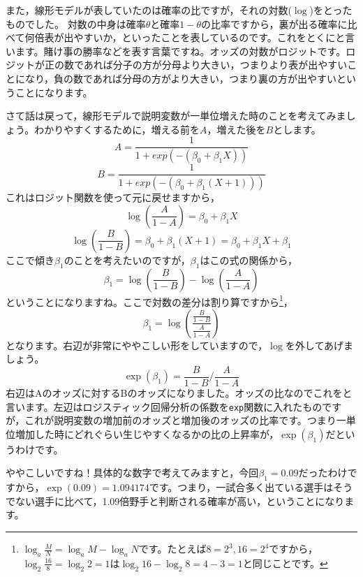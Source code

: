 \documentclass{ltjsbook}
\begin{document}
また，線形モデルが表していたのは確率の比ですが，それの対数($\log$)をとったものでした。
対数の中身は確率$\theta$と確率$1-\theta$の比率ですから，裏が出る確率に比べて何倍表が出やすいか，といったことを表しているのです。これをとくにと言います。賭け事の勝率などを表す言葉ですね。オッズの対数がロジットです。ロジットが正の数であれば分子の方が分母より大きい，つまりより表が出やすいことになり，負の数であれば分母の方がより大きい，つまり裏の方が出やすいということになります。

さて話は戻って，線形モデルで説明変数が一単位増えた時のことを考えてみましょう。わかりやすくするために，増える前を$A$，増えた後を$B$とします。
\[ A = \frac{1}{1+exp(-(\beta_0 + \beta_1X))} \]
\[ B = \frac{1}{1+exp(-(\beta_0 + \beta_1(X+1)))} \]
これはロジット関数を使って元に戻せますから，
\[ \log\left( \frac{A}{1-A} \right) = \beta_0 + \beta_1 X \]
\[ \log\left(\frac{B}{1-B} \right)= \beta_0 + \beta_1 (X+1)  = \beta_0 + \beta_1X + \beta_1\]
ここで傾き$\beta_1$のことを考えたいのですが，$\beta_1$はこの式の関係から，
\[ \beta_1 = \log\left(\frac{B}{1-B} \right) - \log\left( \frac{A}{1-A} \right) \]
ということになりますね。ここで対数の差分は割り算ですから\footnote{$\log_a \frac{M}{N} = \log_a M-\log_a N$です。たとえば$8=2^3,16=2^4$ですから，$\log_2\frac{16}{8} = \log_2 2 = 1$は$\log_2 16 - \log_2 8 = 4 - 3 = 1$と同じことです。}，
\[ \beta_1 = \log\left( \frac{ \frac{B}{1-B} }{ \frac{A}{1-A} } \right) \]
となります。右辺が非常にややこしい形をしていますので，$\log$を外してあげましょう。
\[ \exp(\beta_1) =  \frac{B}{1-B}  \Big/  \frac{A}{1-A}  \]
右辺はAのオッズに対するBのオッズになりました。オッズの比なのでこれをと言います。左辺はロジスティック回帰分析の係数を\verb|exp|関数に入れたものですが，これが説明変数の増加前のオッズと増加後のオッズの比率です。つまり一単位増加した時にどれぐらい生じやすくなるかの比の上昇率が，$\exp(\beta_1)$だというわけです。

ややこしいですね！具体的な数字で考えてみますと，今回$\beta_1=0.09$だったわけですから，$\exp(0.09)=1.094174$です。つまり，一試合多く出ている選手はそうでない選手に比べて，1.09倍野手と判断される確率が高い，ということになります。
\end{document}
